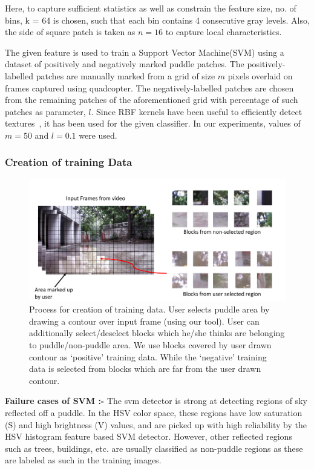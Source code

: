\documentclass[times,10pt,twocolumn,letterpaper]{article}
\begin{document}
Here, to capture sufficient statistics as well as constrain the feature size,
no. of bins, k = 64 is chosen, such that each bin contains 4 consecutive gray
levels. Also, the side of square patch is taken as $n = 16$ to capture local
characteristics.

The given feature is used to train a Support Vector Machine(SVM) using a
dataset of positively and negatively marked puddle patches. The
positively-labelled patches are manually marked from a grid of size $m$ pixels
overlaid on frames captured using quadcopter. The negatively-labelled patches
are chosen from the remaining patches of the aforementioned grid with
percentage of such patches as parameter, $l$. Since RBF kernels have been useful
to efficiently detect textures~\cite{Chapelle99}, it has been used for the given
classifier. In our experiments, values of $m = 50$ and $l = 0.1$ were used.

\subsubsection{Creation of training Data}

\begin{figure}[h!]
\centering
\includegraphics[width=\linewidth]{images/trainingData.pdf}
\caption{Process for creation of training data. User selects puddle area by
drawing a contour over input frame (using our tool). User can additionally
select/deselect blocks which he/she thinks are belonging to puddle/non-puddle
area. We use blocks covered by user drawn contour as `positive' training data.
While the `negative' training data is selected from blocks which are far from
the user drawn contour.}
\label{fig:training}
\end{figure}

\textbf{Failure cases of SVM :- }
The svm detector is strong at detecting regions of sky reflected off a puddle.
In the HSV color space, these regions have low saturation (S) and high
brightness (V) values, and are picked up with high reliability by the HSV
histogram feature based SVM detector. However, other reflected regions such as
trees, buildings, etc. are usually classified as non-puddle regions as these
are labeled as such in the training images.
\end{document}
